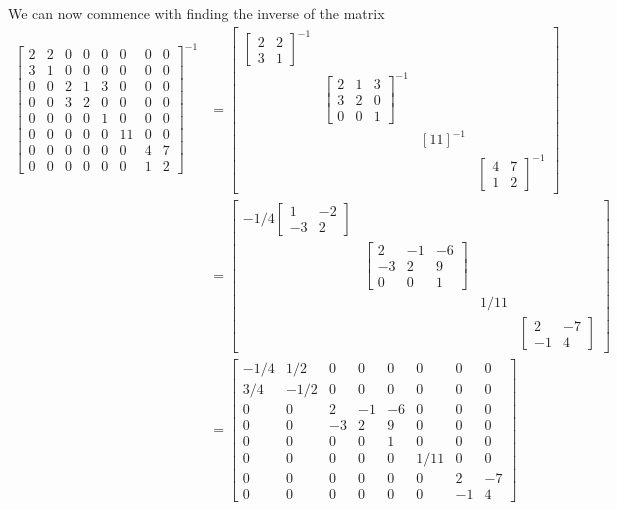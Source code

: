 \documentclass{report}
\begin{document}
We can now commence with finding the inverse of the matrix
$$
\begin{aligned}
\begin{bmatrix} 
2&2&0&0&0&0&0&0\\
3&1&0&0&0&0&0&0\\
0&0&2&1&3&0&0&0\\
0&0&3&2&0&0&0&0\\
0&0&0&0&1&0&0&0\\
0&0&0&0&0&11&0&0\\
0&0&0&0&0&0&4&7\\
0&0&0&0&0&0&1&2
\end{bmatrix}^{-1} & = 
\begin{bmatrix}
\begin{bmatrix} 2 & 2 \\ 3 & 1 \end{bmatrix}^{-1} & & & \\
& \begin{bmatrix} 2 & 1 & 3 \\ 3 & 2 & 0 \\ 0 & 0 & 1 \end{bmatrix}^{-1} & & \\
& & \left[11\right]^{-1} & \\
& & & \begin{bmatrix} 4 & 7 \\ 1 & 2 \end{bmatrix}^{-1}
\end{bmatrix} \\
& = \begin{bmatrix}
-1/4\begin{bmatrix} 1 & -2 \\ -3 & 2 \end{bmatrix} & & & \\
& \begin{bmatrix} 2 & -1 & -6 \\ -3 & 2 & 9 \\ 0 & 0 & 1 \end{bmatrix} & & \\
& & 1/11 & \\
& & & \begin{bmatrix} 2 & -7 \\ -1 & 4 \end{bmatrix}
\end{bmatrix} \\
& = \begin{bmatrix} 
-1/4&1/2&0&0&0&0&0&0\\
3/4&-1/2&0&0&0&0&0&0\\
0&0&2&-1&-6&0&0&0\\
0&0&-3&2&9&0&0&0\\
0&0&0&0&1&0&0&0\\
0&0&0&0&0&1/11&0&0\\
0&0&0&0&0&0&2&-7\\
0&0&0&0&0&0&-1&4
\end{bmatrix}
\end{aligned}
$$
\end{document}
